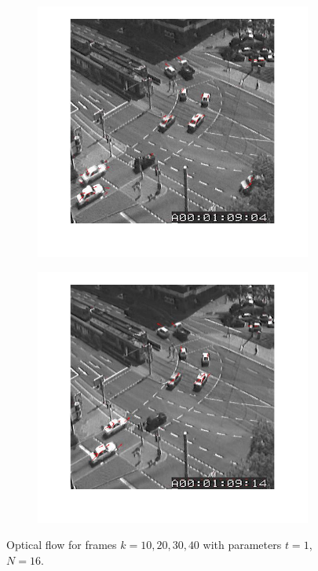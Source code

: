 \documentclass[a4paper]{iacas}
\begin{document}
\begin{figure}[!htbp]
	\begin{subfigure}[b]{0.4\textwidth}
		\includegraphics[width=\textwidth]{104.jpg}
		\caption{}
		\label{fig:104}
	\end{subfigure}
	\begin{subfigure}[b]{0.4\textwidth}
		\includegraphics[width=\textwidth]{105.jpg}
		\caption{}
		\label{fig:105}
	\end{subfigure}

	\caption{Optical flow for frames $k=10, 20, 30,40$ with parameters $t=1$, $N=16$.}
	\label{fig:100}
\end{figure}
\end{document}
